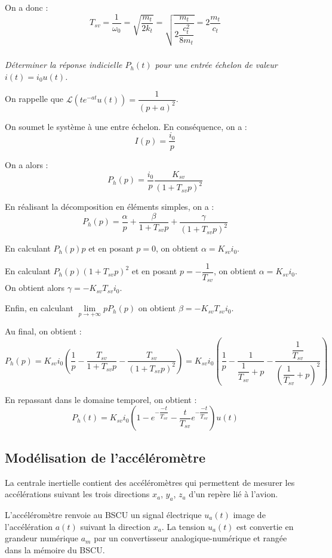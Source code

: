 \documentclass[10pt,fleqn]{article} %
\begin{document}
\begin{multicols}{2}
\begin{corrige}
On a donc : 
$$
T_{sv}=\dfrac{1}{\omega_0} = \sqrt{\dfrac{m_t}{2k_t}} = \sqrt{\dfrac{m_t}{2
\dfrac{c_t^2}{8 m_t}}} = 2\dfrac{m_t}{c_t}
$$
\end{corrige}
\else
\fi


\subparagraph{}
\textit{Déterminer la réponse indicielle $P_h(t)$ pour une entrée échelon de valeur $i(t)=i_0 u(t)$.}

On rappelle que $\mathcal{L}\left(te^{-at}u(t)\right)=\dfrac{1}{\left(p+a\right)^2}$.

\ifprof
\begin{corrige}

On soumet le système à une entre échelon. En conséquence, on a : 
$$
I(p)=\dfrac{i_0}{p}
$$

On a alors :
$$
P_h(p)=\dfrac{i_0}{p}\dfrac{K_{sv}}{\left(1+T_{sv}p\right)^2}
$$

En réalisant la décomposition en éléments simples, on a : 
$$
P_h(p)=\dfrac{\alpha}{p}+\dfrac{\beta}{1+T_{sv}p}+\dfrac{\gamma}{\left(1+T_{sv}
p\right)^2}
$$

En calculant $P_h(p)p$ et en posant $p=0$, on obtient $\alpha = K_{sv}i_0$.

En calculant $P_h(p)\left(1+T_{sv} p\right)^2$ et en posant
$p=-\dfrac{1}{T_{sv}}$, on obtient $\alpha = K_{sv}i_0$. On obtient alors
$\gamma = - K_{sv} T_{sv} i_0$.

Enfin, en calculant $\lim\limits_{p\to +\infty} p P_h(p)$ on obtient $\beta =
-K_{sv} T_{sv} i_0$.

Au final, on obtient : 
$$
P_h(p) = K_{sv} i_0 \left( \dfrac{1}{p} - \dfrac{T_{sv}}{1+T_{sv}p} -
\dfrac{T_{sv}}{\left(1+T_{sv}p\right)^2} \right) 
=
K_{sv} i_0
\left( 
\dfrac{1}{p}
-\dfrac{1}{\dfrac{1}{T_{sv}}+p}
-\dfrac{\dfrac{1}{T_{sv}}}{\left(\dfrac{1}{T_{sv}}+p\right)^2}
\right) 
$$


En repassant dans le domaine temporel, on obtient :
$$
P_h(t) = K_{sv} i_0 \left( 
1-e^{-\dfrac{-t}{T_{sv}}}
-\dfrac{t}{T_{sv}}e^{-\dfrac{-t}{T_{sv}}}
\right) u(t)
$$
\end{corrige}
\else
\fi


\subsection*{Modélisation de l'accéléromètre}
\ifprof
\else
La centrale inertielle contient des accéléromètres qui permettent de mesurer les accélérations suivant les
trois directions $x_a$, $y_a$, $z_a$ d’un repère lié à l’avion.

L’accéléromètre renvoie au BSCU un signal électrique $u_a(t)$ image de l’accélération $a(t)$ suivant la
direction $x_a$. La tension $u_a(t)$ est convertie en grandeur numérique $a_m$ par un convertisseur analogique-numérique et rangée dans la mémoire du BSCU. 
\fi


\end{multicols}
\end{document}
